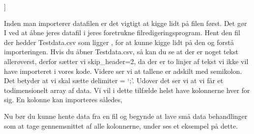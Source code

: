 \documentclass[letterpaper,10pt,english]{jupyterBook}
\begin{document}
\begin{sphinxVerbatim}[commandchars=\\\{\}]
[[ 1.2  2.5]
 [ 5.  10.3]
 [ 7.5 14.8]]
\end{sphinxVerbatim}

Inden man importerer datafilen er det vigtigt at kigge lidt på filen først. Det gør I ved at åbne jeres datafil i jeres foretrukne filredigeringsprogram. Hent den fil der hedder Testdata.csv som ligger , for at kunne kigge lidt på den og forstå importeringen. Hvis du åbner Testdata.csv, så kan du se at der er noget tekst allerøverst, derfor sætter vi skip\_header=2, da der er to linjer af tekst vi ikke vil have importeret i vores kode.
Videre ser vi at tallene er adskilt med semikolon. Det betyder at vi skal sætte delimiter = ‘;’. Udover det ser vi at vi får et todimensionelt array af data. Vi vil i dette tilfælde helst have kolonnerne hver for sig. En kolonne kan importeres således,

\begin{sphinxVerbatim}[commandchars=\\\{\}]
  \PYG{p}{[}\PYG{p}{]}
\end{sphinxVerbatim}

\begin{sphinxVerbatim}[commandchars=\\\{\}]
[1.2 5.  7.5]
\end{sphinxVerbatim}

Nu bør du kunne hente data fra en fil og begynde at lave små data behandlinger som at tage gennemsnittet af alle kolonnerne, under ses et eksempel på dette.

\begin{sphinxVerbatim}[commandchars=\\\{\}]
      

     
\end{sphinxVerbatim}
\end{document}
